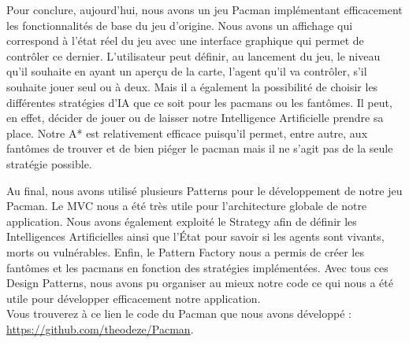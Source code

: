 \documentclass[a4paper, 11pt]{article}
\begin{document}
Pour conclure, aujourd'hui, nous avons un jeu Pacman implémentant efficacement les fonctionnalités de base du jeu d'origine. Nous avons un affichage qui correspond
à l'état réel du jeu avec une interface graphique qui permet de contrôler ce dernier. L'utilisateur peut définir, au lancement du jeu, le niveau qu'il souhaite en ayant un aperçu de la carte, 
l'agent qu'il va contrôler, s'il souhaite jouer seul ou à deux. Mais il a également la possibilité de choisir les différentes stratégies d'IA que ce soit pour les pacmans ou les fantômes. Il peut, en effet, décider de jouer ou de laisser notre Intelligence Artificielle prendre sa place.
Notre A* est relativement efficace puisqu'il permet, entre autre, aux fantômes de trouver et de bien piéger le pacman mais il ne s'agit pas de la seule stratégie possible.

Au final, nous avons utilisé plusieurs Patterns pour le développement de notre jeu Pacman. Le MVC nous a été très utile pour l'architecture globale
de notre application. Nous avons également exploité le Strategy afin de définir les Intelligences Artificielles ainsi que l'État pour savoir si les agents 
sont vivants, morts ou vulnérables. Enfin, le Pattern Factory nous a permis de créer les fantômes et les pacmans en fonction des stratégies implémentées. 
Avec tous ces Design Patterns, nous avons pu organiser au mieux notre code ce qui nous a été utile pour développer efficacement notre application. \\

Vous trouverez à ce lien le code du Pacman que nous avons développé : \url{https://github.com/theodeze/Pacman}.
\end{document}

